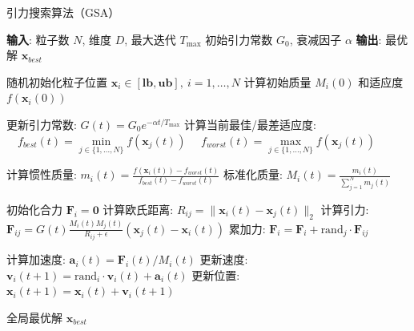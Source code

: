 \documentclass[12pt,a4paper]{article}
\begin{document}
\begin{algorithm}
\caption{引力搜索算法（GSA）}
\label{alg:gsa}

\begin{algorithmic}[1]
\State \textbf{输入}: 
\Statex \quad 粒子数 $N$, 维度 $D$, 最大迭代 $T_{\max}$ 
\Statex \quad 初始引力常数 $G_0$, 衰减因子 $\alpha$
\State \textbf{输出}: 最优解 $\mathbf{x}_{best}$

\State 随机初始化粒子位置 $\mathbf{x}_i \in [\mathbf{lb}, \mathbf{ub}],\ i=1,\dots,N$
\State 计算初始质量 $M_i(0)$ 和适应度 $f(\mathbf{x}_i(0))$

    \State 更新引力常数: $G(t) = G_0 e^{-\alpha t/T_{\max}}$
    \State 计算当前最佳/最差适应度:
    \Statex $\quad f_{best}(t) = \min\limits_{j\in\{1,\dots,N\}} f(\mathbf{x}_j(t))$
    \Statex $\quad f_{worst}(t) = \max\limits_{j\in\{1,\dots,N\}} f(\mathbf{x}_j(t))$
    
        \State 计算惯性质量: 
        \Statex $m_i(t) = \frac{f(\mathbf{x}_i(t)) - f_{worst}(t)}{f_{best}(t) - f_{worst}(t)}$
        \State 标准化质量: $M_i(t) = \frac{m_i(t)}{\sum_{j=1}^N m_j(t)}$
    \EndFor
    
        \State 初始化合力 $\mathbf{F}_i = \mathbf{0}$
            \State 计算欧氏距离: $R_{ij} = \|\mathbf{x}_i(t) - \mathbf{x}_j(t)\|_2$
            \State 计算引力:
            \Statex $\mathbf{F}_{ij} = G(t)\frac{M_i(t)M_j(t)}{R_{ij}+\epsilon}(\mathbf{x}_j(t)-\mathbf{x}_i(t))$
            \State 累加力: $\mathbf{F}_i = \mathbf{F}_i + \text{rand}_j \cdot \mathbf{F}_{ij}$
        \EndFor
        
        \State 计算加速度: $\mathbf{a}_i(t) = \mathbf{F}_i(t)/M_i(t)$
        \State 更新速度: $\mathbf{v}_i(t+1) = \text{rand}_i \cdot \mathbf{v}_i(t) + \mathbf{a}_i(t)$
        \State 更新位置: $\mathbf{x}_i(t+1) = \mathbf{x}_i(t) + \mathbf{v}_i(t+1)$
    \EndFor
\EndFor

\State \Return 全局最优解 $\mathbf{x}_{best}$
\end{algorithmic}
\end{algorithm}
\newpage
\end{document}
